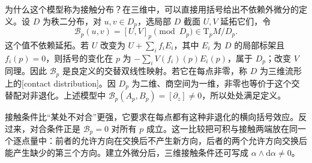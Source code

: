 为什么这个模型称为接触分布？在三维中，可以直接用括号给出不依赖外微分的定义。设 \(D\) 为秩二分布，对 \(u,v\in D_p\)，选局部 \(D\) 截面 \(U,V\) 延拓它们，令
\[
	\mathcal B_p(u,v)=[U,V]_p\pmod{D_p}\in \mathrm{T}_pM/D_p.
\]
这个值不依赖延拓。若 \(U\) 改变为 \(U+\sum_i f_iE_i\)，其中 \(E_i\) 为 \(D\) 的局部标架且 \(f_i(p)=0\)，则括号的变化在 \(p\) 为 \(-\sum_iV(f_i)(p)E_i(p)\)，属于 \(D_p\)；改变 \(V\) 同理。因此 \(\mathcal B_p\) 是良定义的交替双线性映射。若它在每点非零，称 \(D\) 为三维流形上的[contact distribution]。因 \(D_p\) 为二维、商空间为一维，非零也等价于这个交替配对非退化。上述模型中 \(\mathcal B_p(A_p,B_p)=[\partial_z]\neq0\)，所以处处满足定义。

\ProseParagraphBreak

接触条件比“某处不对合”更强，它要求在每点都有这种非退化的横向括号效应。反过来，对合条件正是 \(\mathcal B_p=0\) 对所有 \(p\) 成立。这一比较把可积与接触两端放在同一个逐点量中：前者的允许方向在交换后不产生新方向，后者的两个允许方向交换后能产生缺少的第三个方向。建立外微分后，三维接触条件还可写成 \(\alpha\wedge\mathrm{d}\alpha\neq0\)。


